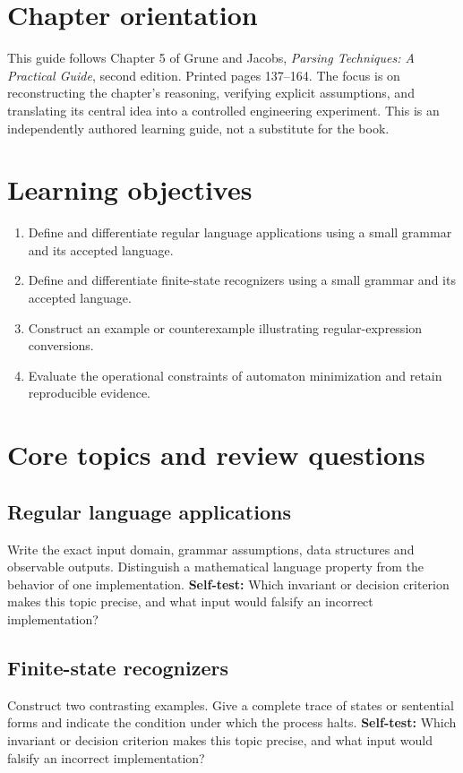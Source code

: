 \documentclass[11pt,letterpaper]{article}
\begin{document}
\makedoctitle\makedocsummary
\tableofcontents\clearpage
\section{Chapter orientation}
This guide follows Chapter 5 of Grune and Jacobs, \emph{Parsing Techniques: A Practical Guide}, second edition. Printed pages 137--164. The focus is on reconstructing the chapter's reasoning, verifying explicit assumptions, and translating its central idea into a controlled engineering experiment. This is an independently authored learning guide, not a substitute for the book.
\section{Learning objectives}
\begin{enumerate}
\item Define and differentiate regular language applications using a small grammar and its accepted language.
\item Define and differentiate finite-state recognizers using a small grammar and its accepted language.
\item Construct an example or counterexample illustrating regular-expression conversions.
\item Evaluate the operational constraints of automaton minimization and retain reproducible evidence.
\end{enumerate}
\section{Core topics and review questions}
\subsection{Regular language applications}
Write the exact input domain, grammar assumptions, data structures and observable outputs. Distinguish a mathematical language property from the behavior of one implementation.
\textbf{Self-test:} Which invariant or decision criterion makes this topic precise, and what input would falsify an incorrect implementation?
\subsection{Finite-state recognizers}
Construct two contrasting examples. Give a complete trace of states or sentential forms and indicate the condition under which the process halts.
\textbf{Self-test:} Which invariant or decision criterion makes this topic precise, and what input would falsify an incorrect implementation?
\end{document}
